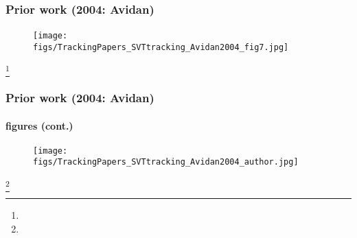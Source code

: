 \begin{frame}
\frametitle{Prior work (2004: Avidan)}
\framesubtitle{}
\logoCSIPCPL\mypagenum
	\begin{figure}
		\texttt{[image: figs/TrackingPapers\_SVTtracking\_Avidan2004\_fig7.jpg]}
	\end{figure}
\footnote{\tiny {}}
\end{frame}


\begin{frame}
\frametitle{Prior work (2004: Avidan)}
\framesubtitle{figures (cont.)}
\logoCSIPCPL\mypagenum
	\begin{figure}
		\texttt{[image: figs/TrackingPapers\_SVTtracking\_Avidan2004\_author.jpg]}
	\end{figure}
\footnote{\tiny {}}
\end{frame}


\printbibliography

